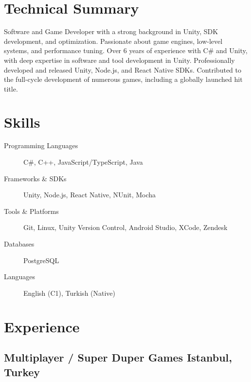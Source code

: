 \documentclass[11pt]{article}
\newcommand{\rside}[1]{
              \hfill {\normalfont\color{accent} #1}%
          }
\begin{document}
          \section{Technical Summary}
          \begin{flushleft}
              Software and Game Developer with a strong background in Unity, SDK development, and optimization. Passionate about game engines, low-level systems, and performance tuning. Over 6 years of experience with  C\# and Unity, with deep expertise in software and tool development in Unity. Professionally developed and released Unity, Node.js, and React Native SDKs. Contributed to the full-cycle development of numerous games, including a globally launched hit title.
          \end{flushleft}
          \section{Skills}
              \begin{description}
                              \item[Programming Languages] C\#, C++, JavaScript/TypeScript, Java
                                          \item[Frameworks \& SDKs] Unity, Node.js, React Native, NUnit, Mocha
                                                      \item[Tools \& Platforms] Git, Linux, Unity Version Control, Android Studio, XCode, Zendesk
                                                                  \item[Databases] PostgreSQL
                                                                              \item[Languages] English (C1), Turkish (Native)
                                                                                      \end{description}
                                                                                      \section{Experience}

                                                                                      \subsection{Multiplayer / Super Duper Games \rside{Istanbul, Turkey}}
\end{document}

